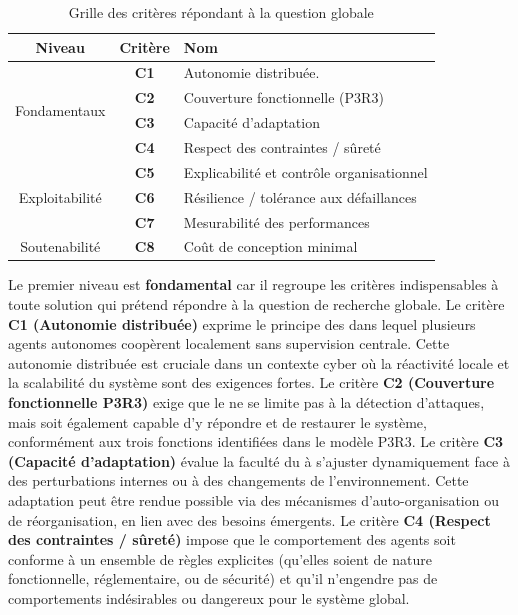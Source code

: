 \begin{table}[H]
  \centering
  \caption{Grille des critères répondant à la question globale}
  \label{tab:critere_hierarchie}
  \small
  \renewcommand{\arraystretch}{1.12}
  \begin{tabular}{ccp{5cm}}
    \hline
    \textbf{Niveau} & \textbf{Critère} & \textbf{Nom}                              \\
    \hline
    \multirow{4}{*}{Fondamentaux}
                    & \textbf{C1}      & Autonomie distribuée.                     \\
                    & \textbf{C2}      & Couverture fonctionnelle (P3R3)           \\
                    & \textbf{C3}      & Capacité d’adaptation                     \\
                    & \textbf{C4}      & Respect des contraintes / sûreté          \\
    \hline
    \multirow{3}{*}{Exploitabilité}
                    & \textbf{C5}      & Explicabilité et contrôle organisationnel \\
                    & \textbf{C6}      & Résilience / tolérance aux défaillances   \\
                    & \textbf{C7}      & Mesurabilité des performances             \\
    \hline
    Soutenabilité
                    & \textbf{C8}      & Coût de conception minimal                \\
    \hline
  \end{tabular}
\end{table}

\noindent
Le premier niveau est \textbf{fondamental} car il regroupe les critères indispensables à toute solution qui prétend répondre à la question de recherche globale. Le critère \textbf{C1 (Autonomie distribuée)} exprime le principe des  dans lequel plusieurs agents autonomes coopèrent localement sans supervision centrale. Cette autonomie distribuée est cruciale dans un contexte cyber où la réactivité locale et la scalabilité du système sont des exigences fortes. Le critère \textbf{C2 (Couverture fonctionnelle P3R3)} exige que le  ne se limite pas à la détection d’attaques, mais soit également capable d'y répondre et de restaurer le système, conformément aux trois fonctions identifiées dans le modèle P3R3. Le critère \textbf{C3 (Capacité d’adaptation)} évalue la faculté du  à s’ajuster dynamiquement face à des perturbations internes ou à des changements de l’environnement. Cette adaptation peut être rendue possible via des mécanismes d’auto-organisation ou de réorganisation, en lien avec des besoins émergents. Le critère \textbf{C4 (Respect des contraintes / sûreté)} impose que le comportement des agents soit conforme à un ensemble de règles explicites (qu’elles soient de nature fonctionnelle, réglementaire, ou de sécurité) et qu’il n’engendre pas de comportements indésirables ou dangereux pour le système global.

